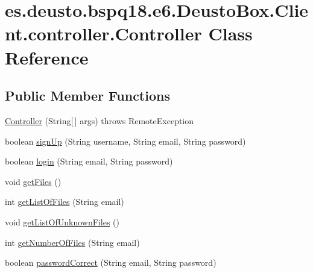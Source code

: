 \hypertarget{classes_1_1deusto_1_1bspq18_1_1e6_1_1_deusto_box_1_1_client_1_1controller_1_1_controller}{}\section{es.\+deusto.\+bspq18.\+e6.\+Deusto\+Box.\+Client.\+controller.\+Controller Class Reference}
\label{classes_1_1deusto_1_1bspq18_1_1e6_1_1_deusto_box_1_1_client_1_1controller_1_1_controller}
\subsection*{Public Member Functions}
\begin{DoxyCompactItemize}
\item 
\mbox{\hyperlink{classes_1_1deusto_1_1bspq18_1_1e6_1_1_deusto_box_1_1_client_1_1controller_1_1_controller_ab331ef380d51c8dacac8f23933a17cb6}{Controller}} (String\mbox{[}$\,$\mbox{]} args)  throws Remote\+Exception 
\item 
boolean \mbox{\hyperlink{classes_1_1deusto_1_1bspq18_1_1e6_1_1_deusto_box_1_1_client_1_1controller_1_1_controller_a3cf016bbe56cf63e0268ed78aa7beb31}{sign\+Up}} (String username, String email, String password)
\item 
boolean \mbox{\hyperlink{classes_1_1deusto_1_1bspq18_1_1e6_1_1_deusto_box_1_1_client_1_1controller_1_1_controller_a2ee6b8bc2abaa3ca81032e12d9cb54fa}{login}} (String email, String password)
\item 
void \mbox{\hyperlink{classes_1_1deusto_1_1bspq18_1_1e6_1_1_deusto_box_1_1_client_1_1controller_1_1_controller_a6d1c667ff04ca4ea077464d8b9b5fcda}{get\+Files}} ()
\item 
int \mbox{\hyperlink{classes_1_1deusto_1_1bspq18_1_1e6_1_1_deusto_box_1_1_client_1_1controller_1_1_controller_a7a6c0561f5dc46c979628cf4ffa038ee}{get\+List\+Of\+Files}} (String email)
\item 
void \mbox{\hyperlink{classes_1_1deusto_1_1bspq18_1_1e6_1_1_deusto_box_1_1_client_1_1controller_1_1_controller_afe85d6590795120632d37f9c47498479}{get\+List\+Of\+Unknown\+Files}} ()
\item 
int \mbox{\hyperlink{classes_1_1deusto_1_1bspq18_1_1e6_1_1_deusto_box_1_1_client_1_1controller_1_1_controller_adfa5a297c9a23f23c03b401d872640bd}{get\+Number\+Of\+Files}} (String email)
\item 
boolean \mbox{\hyperlink{classes_1_1deusto_1_1bspq18_1_1e6_1_1_deusto_box_1_1_client_1_1controller_1_1_controller_a4ac688f51915b4557f276c86091bdf18}{password\+Correct}} (String email, String password)

\end{DoxyCompactItemize}
